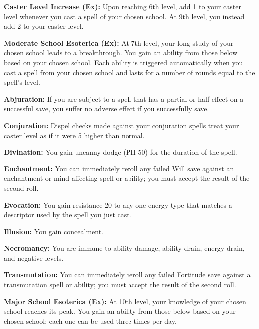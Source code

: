 \textbf{Caster Level Increase (Ex):} Upon reaching 6th level, add 1 to your caster level whenever you cast a spell of your chosen school. At 9th level, you instead add 2 to your caster level.

\textbf{Moderate School Esoterica (Ex):} At 7th level, your long study of your chosen school leads to a breakthrough. You gain an ability from those below based on your chosen school. Each ability is triggered automatically when you cast a spell from your chosen school and lasts for a number of rounds equal to the spell's level.

\begin{itemize*}
\item \textbf{Abjuration:} If you are subject to a spell that has a partial or half effect on a successful save, you suffer no adverse effect if you successfully save.
\item \textbf{Conjuration:} Dispel checks made against your conjuration spells treat your caster level as if it were 5 higher than normal.
\item \textbf{Divination:} You gain uncanny dodge (PH 50) for the duration of the spell.
\item \textbf{Enchantment:} You can immediately reroll any failed Will save against an enchantment or mind-affecting spell or ability; you must accept the result of the second roll.
\item \textbf{Evocation:} You gain resistance 20 to any one energy type that matches a descriptor used by the spell you just cast.
\item \textbf{Illusion:} You gain concealment.
\item \textbf{Necromancy:} You are immune to ability damage, ability drain, energy drain, and negative levels.
\item \textbf{Transmutation:} You can immediately reroll any failed Fortitude save against a transmutation spell or ability; you must accept the result of the second roll.
\end{itemize*}

\textbf{Major School Esoterica (Ex):} At 10th level, your knowledge of your chosen school reaches its peak. You gain an ability from those below based on your chosen school; each one can be used three times per day.

